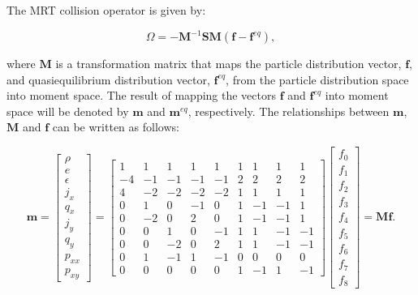 \documentclass[pdftex,ms]{pittetd}
\newcommand{\colop}{\Omega}
\newcommand{\transM}{\mathbf{M}}
\newcommand{\relaxM}{\mathbf{S}}
\begin{document}
The MRT collision operator is given by:

\begin{equation} \label{eq:mrt-colop}
	\colop = - {\transM}^{-1} \relaxM \transM (\mathbf{f} - \mathbf{f}^{eq}),
\end{equation}

\noindent where $\transM$ is a transformation matrix that maps the particle distribution vector, $\mathbf{f}$, and quasiequilibrium distribution vector, $\mathbf{f}^{eq}$, from the particle distribution space into moment space.
The result of mapping the vectors $\mathbf{f}$ and $\mathbf{f}^{eq}$ into moment space will be denoted by $\mathbf{m}$ and $\mathbf{m}^{eq}$, respectively.
The relationships between $\mathbf{m}$, $\transM$ and $\mathbf{f}$ can be written as follows:

\begin{equation} \label{eq:transformation-matrix}
\mathbf{m} = \begin{bmatrix}
\rho \\ e \\ \epsilon \\ j_x \\ q_x \\ j_y \\ q_y \\ p_{xx} \\ p_{xy}
\end{bmatrix} = \begin{bmatrix}
1 & 1 & 1 & 1 & 1 & 1 & 1 & 1 & 1 \\
-4 & -1 & -1 & -1 & -1 & 2 & 2 & 2 & 2 \\
4 & -2 & -2 & -2 & -2 & 1 & 1 & 1 & 1 \\
0 & 1 & 0 & -1 & 0 & 1 & -1 & -1 & 1 \\
0 & -2 & 0 & 2 & 0 & 1 & -1 & -1 & 1 \\
0 & 0 & 1 & 0 & -1 & 1 & 1 & -1 & -1 \\
0 & 0 & -2 & 0 & 2 & 1 & 1 & -1 & -1 \\
0 & 1 & -1 & 1 & -1 & 0 & 0 & 0 & 0 \\
0 & 0 & 0 & 0 & 0 & 1 & -1 & 1 & -1
\end{bmatrix} \begin{bmatrix}
f_0 \\
f_1 \\
f_2 \\
f_3 \\
f_4 \\
f_5 \\
f_6 \\
f_7 \\
f_8
\end{bmatrix} = \transM \mathbf{f}.
\end{equation}
\end{document}
